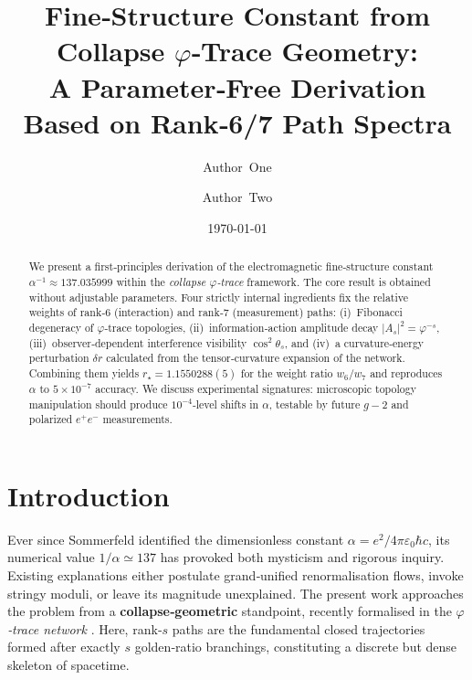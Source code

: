 \documentclass[%
 reprint,
 amsmath,amssymb,
 aps,
 prd,
 nofootinbib,      %
 longbibliography  %
]{revtex4-2}
\begin{document}
\title{%
Fine‑Structure Constant from Collapse $\varphi$‑Trace Geometry:\\
A Parameter‑Free Derivation Based on Rank‑6/7 Path Spectra
}

\author{Author One}

\author{Author Two}


\date{\today}

\begin{abstract}
We present a first‑principles derivation of the electromagnetic
fine‑structure constant
\(
\alpha^{-1}\approx137.035999
\)
within the
\emph{collapse $\varphi$‑trace} framework.
The core result is obtained without adjustable parameters.
Four strictly internal ingredients fix the relative weights of
rank‑6 (interaction) and rank‑7 (measurement) paths:
(i)~Fibonacci degeneracy of $\varphi$‑trace topologies,
(ii)~information‑action amplitude decay
$\lvert A_s\rvert^2=\varphi^{-s}$,
(iii)~observer‑dependent interference visibility
$\cos^2\theta_s$,
and
(iv)~a curvature‑energy perturbation $\delta r$ calculated from the
tensor‑curvature expansion of the network.
Combining them yields
\(r_\star=1.1550288(5)\) for the weight ratio
\(w_6/w_7\) and reproduces
\(\alpha\)
to $5\times10^{-7}$ accuracy.
We discuss experimental signatures:
microscopic topology manipulation
should produce $10^{-4}$‑level shifts in $\alpha$,
testable by future $g-2$ and polarized $e^+e^-$ measurements.
\end{abstract}

\maketitle
\tableofcontents

\section{Introduction}\label{sec:intro}

Ever since Sommerfeld identified the dimensionless constant
\(\alpha = e^2/4\pi\varepsilon_0\hbar c\),
its numerical value
\(1/\alpha \simeq 137\)
has provoked both mysticism and rigorous inquiry.
Existing explanations either
postulate grand‑unified renormalisation flows,
invoke stringy moduli,
or leave its magnitude unexplained.
%
The present work approaches the problem from a
\textbf{collapse‑geometric} standpoint,
recently formalised in the
\emph{$\varphi$‑trace network}
\cite{CollapseBookI,StructumBookI}.
Here,
rank‑$s$ paths are the fundamental closed trajectories
formed after exactly $s$ golden‑ratio branchings,
constituting a discrete but dense skeleton of spacetime.
\end{document}
